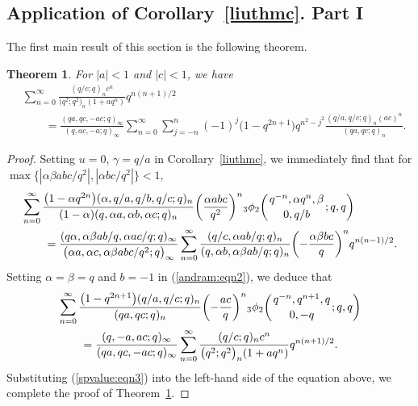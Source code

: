\documentclass[10pt,a4paper]{amsart}
\numberwithin{equation}{section}
\newtheorem{Theorem}{Theorem}[section]
\begin{document}
\subsection{Application of Corollary~\ref{liuthmc}. Part I}
The first main result of this section is the following theorem.
\begin{Theorem}\label{andrrthm1} For $|a|<1$ and $|c|<1$, we have
	\begin{align*} %
		&\sum_{n=0}^\infty \frac{(q/c; q)_n c^n}{\bigl(q^2; q^2\bigr)_n (1+aq^n)} q^{n(n+1)/2}\\
		&\qquad{}=\frac{(qa, qc, -ac; q)_\infty}{(q, ac, -a; q)_{\infty}}
		\sum_{n=0}^\infty \sum_{j=-n}^n (-1)^j \bigl(1-q^{2n+1}\bigr) q^{n^2-j^2}
		\frac{(q/a, q/c; q)_n (ac)^n}{(qa, qc; q)_n}. \nonumber
	\end{align*}	
\end{Theorem}
\begin{proof}
Setting $u=0$, $\gamma=q/a$ in Corollary~\ref{liuthmc}, we immediately find that for $\max\{|\alpha \beta abc/q^2|,\allowbreak |\alpha bc/q^2|\}<1$,
\begin{align}
	&\sum_{n=0}^\infty \frac{\bigl(1-\alpha q^{2n}\bigr)(\alpha, q/a, q/b, q/c; q)_n}{(1-\alpha)(q, \alpha a, \alpha b, \alpha c; q)_n}\biggl(\frac{\alpha abc}{q^2}\biggr)^n
	{_3\phi_2}\biggl({{q^{-n}, \alpha q^n, \beta}
		\atop{0, q/b}}; q, q\biggr)\nonumber\\
	&\qquad{}=\frac{(q\alpha, \alpha \beta ab/q, \alpha ac/q; q )_\infty}{\bigl(\alpha a,\alpha c, \alpha \beta abc/q^2; q \bigr)_\infty}
	\sum_{n=0}^\infty \frac{(q/c, \alpha ab/q; q)_n}{(q, \alpha b, \alpha \beta ab/q; q)_n}\biggl(-\frac{\alpha \beta bc}{q}\biggr)^n q^{n(n-1)/2}.\label{andram:eqn2}
\end{align}
Setting $\alpha=\beta=q$ and $b=-1$ in (\ref{andram:eqn2}), we deduce that
	\begin{align*}
		&\sum_{n=0}^\infty \frac{\bigl(1-q^{2n+1}\bigr)(q/a, q/c; q)_n}{(qa, q c; q)_n}\biggl(-\frac{ac}{q}\biggr)^n
		{_3\phi_2}\biggl({{q^{-n}, q^{n+1}, q}
			\atop{0, -q}}; q, q\biggr)\\
		&\qquad{}=\frac{(q, -a, ac; q )_\infty}{(qa, qc, -ac; q )_\infty}
		\sum_{n=0}^\infty \frac{(q/c; q)_n c^n}{\bigl(q^2; q^2\bigr)_n (1+aq^n)} q^{n(n+1)/2}.\nonumber
	\end{align*}	
	Substituting (\ref{spvalue:eqn3}) into the left-hand side of the equation above, we complete the proof of Theorem~\ref{andrrthm1}.
\end{proof}
\end{document}
